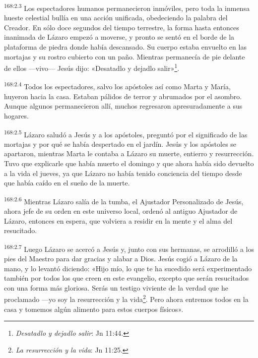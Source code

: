 \par 
\textsuperscript{168:2.3} Los espectadores humanos permanecieron inmóviles, pero toda la inmensa hueste celestial bullía en una acción unificada, obedeciendo la palabra del Creador. En sólo doce segundos del tiempo terrestre, la forma hasta entonces inanimada de Lázaro empezó a moverse, y pronto se sentó en el borde de la plataforma de piedra donde había descansado. Su cuerpo estaba envuelto en las mortajas y su rostro cubierto con un paño. Mientras permanecía de pie delante de ellos ---vivo--- Jesús dijo: «Desatadlo y dejadlo salir»\footnote{\textit{Desatadlo y dejadlo salir}: Jn 11:44.}.

\par 
\textsuperscript{168:2.4} Todos los espectadores, salvo los apóstoles así como Marta y María, huyeron hacia la casa. Estaban pálidos de terror y abrumados por el asombro. Aunque algunos permanecieron allí, muchos regresaron apresuradamente a sus hogares.

\par 
\textsuperscript{168:2.5} Lázaro saludó a Jesús y a los apóstoles, preguntó por el significado de las mortajas y por qué se había despertado en el jardín. Jesús y los apóstoles se apartaron, mientras Marta le contaba a Lázaro su muerte, entierro y resurrección. Tuvo que explicarle que había muerto el domingo y que ahora había sido devuelto a la vida el jueves, ya que Lázaro no había tenido conciencia del tiempo desde que había caído en el sueño de la muerte.

\par 
\textsuperscript{168:2.6} Mientras Lázaro salía de la tumba, el Ajustador Personalizado de Jesús, ahora jefe de su orden en este universo local, ordenó al antiguo Ajustador de Lázaro, entonces en espera, que volviera a residir en la mente y el alma del resucitado.

\par 
\textsuperscript{168:2.7} Luego Lázaro se acercó a Jesús y, junto con sus hermanas, se arrodilló a los pies del Maestro para dar gracias y alabar a Dios. Jesús cogió a Lázaro de la mano, y lo levantó diciendo: «Hijo mío, lo que te ha sucedido será experimentado también por todos los que creen en este evangelio, excepto que serán resucitados con una forma más gloriosa. Serás un testigo viviente de la verdad que he proclamado ---yo soy la resurrección y la vida\footnote{\textit{La resurrección y la vida}: Jn 11:25.}. Pero ahora entremos todos en la casa y tomemos algún alimento para estos cuerpos físicos».

